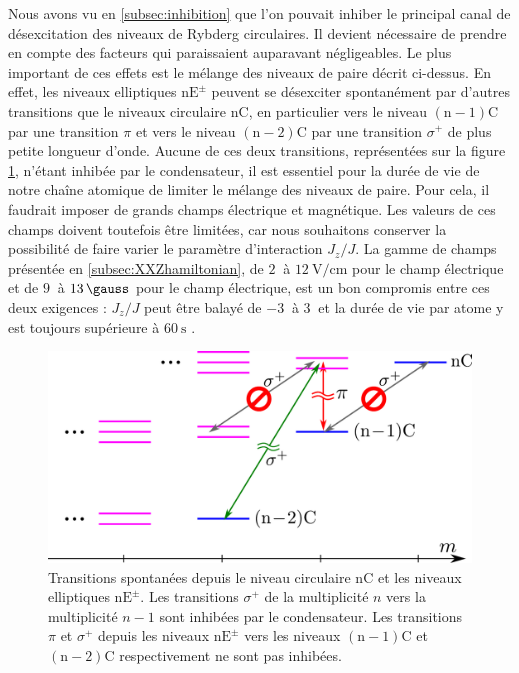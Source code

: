 \noindent Nous avons vu en \ref{subsec:inhibition} que l'on pouvait inhiber le principal canal de désexcitation des niveaux de Rybderg circulaires.
Il devient nécessaire de prendre en compte des facteurs qui paraissaient auparavant négligeables.
Le plus important de ces effets est le mélange des niveaux de paire décrit ci-dessus.
En effet, les niveaux elliptiques $\mathrm{nE^{\pm}}$ peuvent se désexciter spontanément par d'autres transitions que le niveaux circulaire $\mathrm{nC}$, en particulier vers le niveau $\mathrm{(n-1)C}$ par une transition $\pi$ et vers le niveau $\mathrm{(n-2)C}$ par une transition $\sigma^+$ de plus petite longueur d'onde.
Aucune de ces deux transitions, représentées sur la figure \ref{fig:sigma_pi}, n'étant inhibée par le condensateur, il est essentiel pour la durée de vie de notre chaîne atomique de limiter le mélange des niveaux de paire.
Pour cela, il faudrait imposer de grands champs électrique et magnétique.
Les valeurs de ces champs doivent toutefois être limitées, car nous souhaitons conserver la possibilité de faire varier le paramètre d'interaction $J_z/J$.
La gamme de champs présentée en \ref{subsec:XXZhamiltonian}, de $\SI{2}{}$ à $\SI{12}{\V/\cm}$ pour le champ électrique et de $\SI{9}{}$ à $\SI{13}{\gauss}$ pour le champ électrique, est un bon compromis entre ces deux exigences : $J_z/J$ peut être balayé de $\SI{-3}{}$ à $\SI[retain-explicit-plus]{+3}{}$ et la durée de vie par atome y est toujours supérieure à $\SI{60}{\s}$ \cite{ENS_PRE_CIRCSIM}.
\begin{figure}[h]
\centering
\includegraphics[width=0.7 \linewidth]{figures/circsim/sigma_pi}
\caption[Transitions spontanées depuis les niveaux elliptiques $\mathrm{nE^\pm}$]{
Transitions spontanées depuis le niveau circulaire $\mathrm{nC}$ et les niveaux elliptiques $\mathrm{nE^\pm}$.
Les transitions $\sigma^+$ de la multiplicité $n$ vers la multiplicité $n-1$ sont inhibées par le condensateur.
Les transitions $\pi$ et $\sigma^+$ depuis les niveaux $\mathrm{nE^\pm}$ vers les niveaux $\mathrm{(n-1)C}$ et $\mathrm{(n-2)C}$ respectivement ne sont pas inhibées.
}
\label{fig:sigma_pi}
\end{figure}

